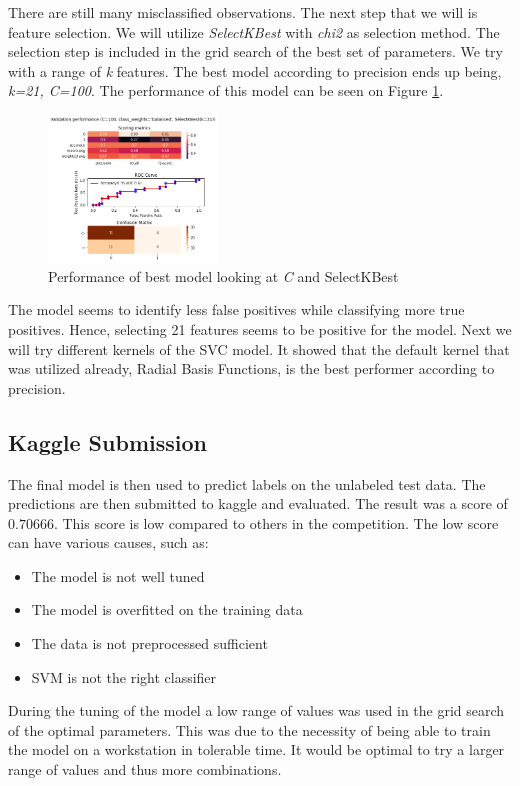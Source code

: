 There are still many misclassified observations. The next step that we will is feature selection. We will utilize \textit{SelectKBest} with \textit{chi2} as selection method. The selection step is included in the grid search of the best set of parameters. We try with a range of \textit{k} features. The best model according to precision ends up being, \textit{k=21, C=100}. The performance of this model can be seen on Figure \ref{fig:results_gridcv_balanced_C_selKBest}.

\begin{figure}
  \centering
  \includegraphics[width=0.4\textwidth]{../project/images/results_gridcv_balanced-C-selectKBest.png}
  \caption{Performance of best model looking at \textit{C} and SelectKBest}
  \label{fig:results_gridcv_balanced_C_selKBest}
\end{figure}

The model seems to identify less false positives while classifying more true positives. Hence, selecting 21 features seems to be positive for the model. Next we will try different kernels of the SVC model. It showed that the default kernel that was utilized already, Radial Basis Functions, is the best performer according to precision.  

\subsection{Kaggle Submission}
The final model is then used to predict labels on the unlabeled test data. The predictions are then submitted to kaggle and evaluated. The result was a score of $0.70666$. This score is low compared to others in the competition. The low score can have various causes, such as:
\begin{itemize}
  \item The model is not well tuned
  \item The model is overfitted on the training data
  \item The data is not preprocessed sufficient
  \item SVM is not the right classifier
\end{itemize}
During the tuning of the model a low range of values was used in the grid search of the optimal parameters. This was due to the necessity of being able to      train the model on a workstation in tolerable time. It would be optimal to try a larger range of values and thus more combinations. 

